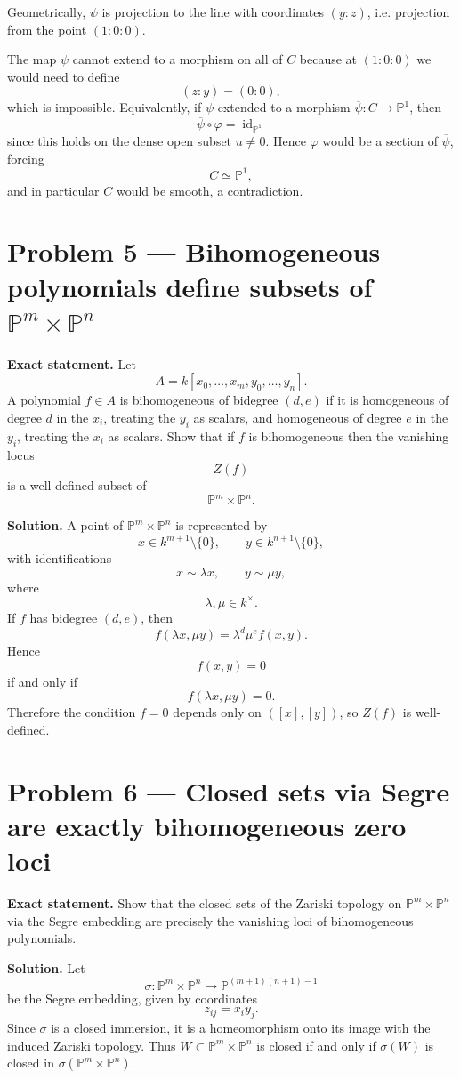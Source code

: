 \documentclass[12pt,a4paper]{article}
\theoremstyle{plain}
\theoremstyle{definition}      %
\begin{document}
Geometrically, \(\psi\) is projection to the line with coordinates \((y:z)\), i.e. projection from the point \((1:0:0)\).

The map \(\psi\) cannot extend to a morphism on all of \(C\) because at \((1:0:0)\) we would need to define
\[
(z:y)=(0:0),
\]
which is impossible.
Equivalently, if \(\psi\) extended to a morphism \(\overline\psi:C\to\mathbb P^1\), then
\[
\overline\psi\circ\varphi=\operatorname{id}_{\mathbb P^1}
\]
since this holds on the dense open subset \(u\neq 0\).
Hence \(\varphi\) would be a section of \(\overline\psi\), forcing
\[
C\simeq \mathbb P^1,
\]
and in particular \(C\) would be smooth, a contradiction.


\section*{Problem 5 — Bihomogeneous polynomials define subsets of \(\mathbb P^m\times \mathbb P^n\)}

\textbf{Exact statement.}
Let
\[
A=k[x_0,\dots,x_m,y_0,\dots,y_n].
\]
A polynomial \(f\in A\) is bihomogeneous of bidegree \((d,e)\) if it is homogeneous of degree \(d\) in the \(x_i\), treating the \(y_i\) as scalars, and homogeneous of degree \(e\) in the \(y_i\), treating the \(x_i\) as scalars.
Show that if \(f\) is bihomogeneous then the vanishing locus
\[
Z(f)
\]
is a well-defined subset of
\[
\mathbb P^m\times \mathbb P^n.
\]

\textbf{Solution.}
A point of \(\mathbb P^m\times\mathbb P^n\) is represented by
\[
x\in k^{m+1}\setminus\{0\},
\qquad
y\in k^{n+1}\setminus\{0\},
\]
with identifications
\[
x\sim \lambda x,
\qquad
y\sim \mu y,
\]
where
\[
\lambda,\mu\in k^\times.
\]
If \(f\) has bidegree \((d,e)\), then
\[
f(\lambda x,\mu y)=\lambda^d \mu^e f(x,y).
\]
Hence
\[
f(x,y)=0
\]
if and only if
\[
f(\lambda x,\mu y)=0.
\]
Therefore the condition \(f=0\) depends only on \(([x],[y])\), so \(Z(f)\) is well-defined.


\section*{Problem 6 — Closed sets via Segre are exactly bihomogeneous zero loci}

\textbf{Exact statement.}
Show that the closed sets of the Zariski topology on \(\mathbb P^m\times \mathbb P^n\) via the Segre embedding are precisely the vanishing loci of bihomogeneous polynomials.

\textbf{Solution.}
Let
\[
\sigma:\mathbb P^m\times \mathbb P^n\to \mathbb P^{(m+1)(n+1)-1}
\]
be the Segre embedding, given by coordinates
\[
z_{ij}=x_i y_j.
\]
Since \(\sigma\) is a closed immersion, it is a homeomorphism onto its image with the induced Zariski topology.
Thus \(W\subset \mathbb P^m\times\mathbb P^n\) is closed if and only if \(\sigma(W)\) is closed in \(\sigma(\mathbb P^m\times\mathbb P^n)\).
\end{document}
